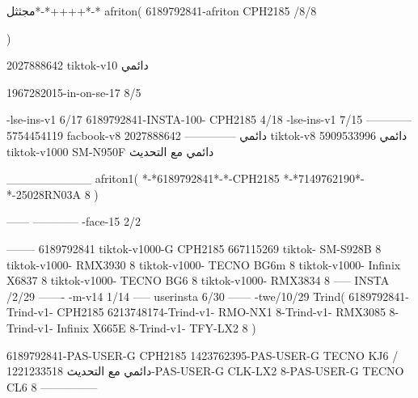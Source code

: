 مجثثل*-*++++*-*
afriton(
6189792841-afriton CPH2185  /8/8

)

2027888642 tiktok-v10
دائمي

1967282015-in-on-se-17 8/5

-lse-ins-v1 6/17
6189792841-INSTA-100- CPH2185 4/18
-lse-ins-v1 7/15
------------
5754454119 facbook-v8
دائمي
--------------
2027888642 tiktok-v8
دائمي
5909533996 tiktok-v1000  SM-N950F
دائمي مع التحديث

__________
afriton1(
*-*6189792841*-*-CPH2185
*-*7149762190*-*-25028RN03A  8
)


------
------------
-face-15 2/2

--------
6189792841 tiktok-v1000-G CPH2185 
667115269 tiktok- SM-S928B  8 tiktok-v1000- RMX3930  8 tiktok-v1000- TECNO BG6m  8 tiktok-v1000- Infinix X6837  8 tiktok-v1000- TECNO BG6  8 tiktok-v1000- RMX3834  8\9
-----
 INSTA /2/29
-------
-m-v14 1/14
-----
userinsta 6/30
------
-twe/10/29
Trind(
6189792841-Trind-v1- CPH2185 
6213748174-Trind-v1-  RMO-NX1  8-Trind-v1-  RMX3085  8-Trind-v1-  Infinix X665E  8-Trind-v1-  TFY-LX2  8\6
)


6189792841-PAS-USER-G CPH2185 
1423762395-PAS-USER-G TECNO KJ6  /دائمي مع التحديث
1221233518-PAS-USER-G CLK-LX2 8-PAS-USER-G TECNO CL6 8\8
    ---------------
